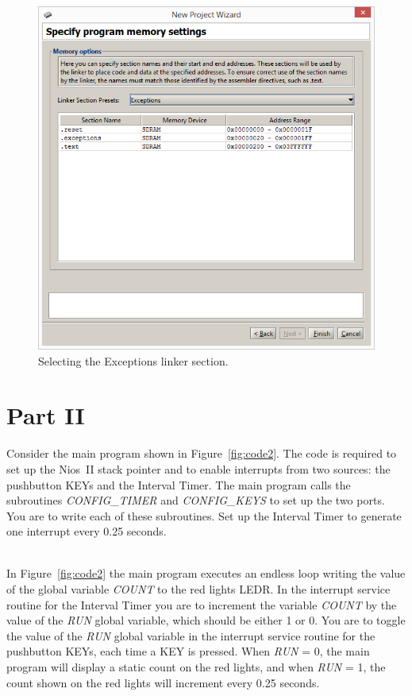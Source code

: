 \documentclass[epsfig,10pt,fullpage]{article}
\begin{document}
\begin{figure}[H]
	\begin{center}
	\includegraphics[scale=0.58]{figures/exceptions.png}
	\end{center}
	\vspace{-0.25cm}\caption{Selecting the {\sf Exceptions} linker section.}
\label{fig:exceptions}
\end{figure}

\newpage
\section*{ Part II}
Consider the main program shown in Figure~\ref{fig:code2}. The code is required to set up 
the Nios~II stack pointer and to enable interrupts from two sources: the pushbutton KEYs
and the Interval Timer.  The main program calls the subroutines {\it CONFIG\_TIMER} and 
{\it CONFIG\_KEYS} to set up the two ports. You are to write each of these subroutines. Set 
up the Interval Timer to generate one interrupt every 0.25 seconds.

~\\
In Figure~\ref{fig:code2} the main program executes an endless loop writing the value of
the global variable {\it COUNT} to the red lights LEDR.  In the interrupt service routine for 
the Interval Timer you are to increment the variable {\it COUNT} 
by the value of the {\it RUN} global variable, 
which should be either 1 or 0.  You are to toggle the value of the {\it RUN} global variable 
in the interrupt service routine for the pushbutton KEYs, each time a KEY is pressed.
When {\it RUN} = 0, the main program will display a static count on the red lights,
and when {\it RUN} = 1, the count shown on the red lights will increment every 0.25 seconds.
\end{document}
